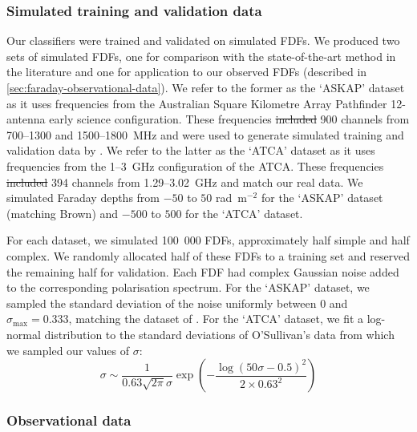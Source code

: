 \documentclass[11pt, a4paper]{book}
\providecommand{\DIFaddtex}[1]{{\protect\color{blue}\uwave{#1}}} %
\providecommand{\DIFdeltex}[1]{{\protect\color{red}\sout{#1}}}                      %
\providecommand{\DIFaddbegin}{} %
\providecommand{\DIFaddend}{} %
\providecommand{\DIFdelbegin}{} %
\providecommand{\DIFdelend}{} %
\providecommand{\DIFadd}[1]{\texorpdfstring{\DIFaddtex{#1}}{#1}} %
\providecommand{\DIFdel}[1]{\texorpdfstring{\DIFdeltex{#1}}{}} %
\newcommand{\DIFscaledelfig}{0.5}
\newlength{\DIFdelgraphicswidth} %
\newlength{\DIFdelgraphicsheight} %
\newcommand{\DIFaddincludegraphics}[2][]{{\color{blue}\fbox{\DIFOincludegraphics[#1]{#2}}}} %
\newcommand{\DIFdelincludegraphics}[2][]{%
\sbox{\DIFdelgraphicsbox}{\DIFOincludegraphics[#1]{#2}}%
\settoboxwidth{\DIFdelgraphicswidth}{\DIFdelgraphicsbox} %
\settoboxtotalheight{\DIFdelgraphicsheight}{\DIFdelgraphicsbox} %
\scalebox{\DIFscaledelfig}{%
\parbox[b]{\DIFdelgraphicswidth}{\usebox{\DIFdelgraphicsbox}\\[-\baselineskip] \rule{\DIFdelgraphicswidth}{0em}}\llap{\resizebox{\DIFdelgraphicswidth}{\DIFdelgraphicsheight}{%
\setlength{\unitlength}{\DIFdelgraphicswidth}%
\begin{picture}(1,1)%
\thicklines\linethickness{2pt} %
{\color[rgb]{1,0,0}\put(0,0){\framebox(1,1){}}}%
{\color[rgb]{1,0,0}\put(0,0){\line( 1,1){1}}}%
{\color[rgb]{1,0,0}\put(0,1){\line(1,-1){1}}}%
\end{picture}%
}\hspace*{3pt}}} %
} %
\DeclareRobustCommand{\DIFaddbegin}{\DIFOaddbegin \let\includegraphics\DIFaddincludegraphics} %
\DeclareRobustCommand{\DIFaddend}{\DIFOaddend \let\includegraphics\DIFOincludegraphics} %
\DeclareRobustCommand{\DIFdelbegin}{\DIFOdelbegin \let\includegraphics\DIFdelincludegraphics} %
\DeclareRobustCommand{\DIFdelend}{\DIFOaddend \let\includegraphics\DIFOincludegraphics} %
\begin{document}
  \subsubsection{Simulated training and validation data}
  \label{sec:faraday-simulated-training-data}

    Our classifiers were trained and validated on simulated FDFs. We produced two sets of simulated FDFs, one for comparison with the state-of-the-art method in the literature and one for application to our observed FDFs (described in \autoref{sec:faraday-observational-data}). We refer to the former as the `ASKAP' dataset as it uses frequencies from the Australian Square Kilometre Array Pathfinder 12-antenna early science configuration. These frequencies \DIFdelbegin \DIFdel{included }\DIFdelend \DIFaddbegin \DIFadd{include }\DIFaddend 900 channels from 700--1300 and 1500--1800~MHz and were used to generate simulated training and validation data by \citet{brown_classifying_2018}. We refer to the latter as the `ATCA' dataset as it uses frequencies from the 1--3~GHz configuration of the ATCA. These frequencies \DIFdelbegin \DIFdel{included }\DIFdelend \DIFaddbegin \DIFadd{include }\DIFaddend 394 channels from 1.29--3.02~GHz and match our real data. We simulated Faraday depths from $-50$ to $50$ rad~m$^{-2}$ for the `ASKAP' dataset (matching Brown) and $-500$ to $500$ \DIFaddbegin \DIFadd{rad~m$^{-2}$ }\DIFaddend for the `ATCA' dataset.

    For each dataset, we simulated 100~000 FDFs, approximately half simple and half complex. We randomly allocated half of these FDFs to a training set and reserved the remaining half for validation. Each FDF had complex Gaussian noise added to the corresponding polarisation spectrum. For the `ASKAP' dataset, we sampled the standard deviation of the noise uniformly between 0 and $\sigma_{\max} = 0.333$, matching the dataset of \citet{brown_classifying_2018}.
    For the `ATCA' dataset, we fit a log-normal distribution to the standard deviations of O'Sullivan's data \citep{osullivan_broad-band_2017} from which we sampled our values of $\sigma$:
    \begin{equation}
      \sigma \sim \frac{1}{0.63 \sqrt{2 \pi} \sigma} \exp \left(-\frac{\log\left(50 \sigma - 0.5\right)^2}{2 \times 0.63^2}\right)
    \end{equation}


  \subsubsection{Observational data}
  \label{sec:faraday-observational-data}
\end{document}
